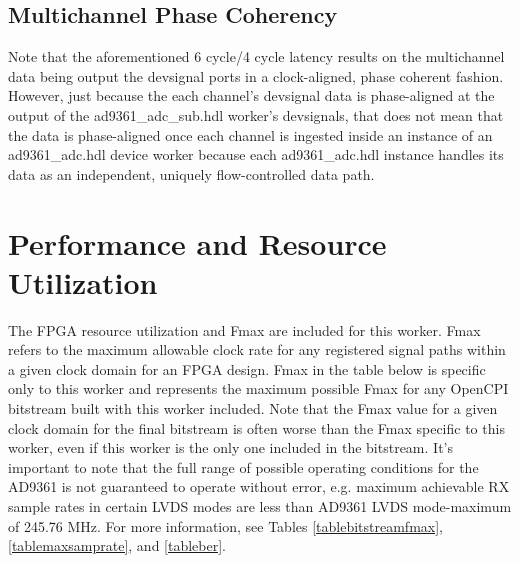 \documentclass{article}
\def\comp{ad9361\_adc\_sub}
\begin{document}
\subsection*{Multichannel Phase Coherency}
Note that the aforementioned 6 cycle/4 cycle latency results on the multichannel data being output the devsignal ports in a clock-aligned, phase coherent fashion. However, just because the each channel's devsignal data is phase-aligned at the output of the \comp{}.hdl worker's devsignals, that does not mean that the data is phase-aligned once each channel is ingested inside an instance of an ad9361\_adc.hdl device worker because each ad9361\_adc.hdl instance handles its data as an independent, uniquely flow-controlled data path.

\pagebreak
\section*{Performance and Resource Utilization}
\noindent
The FPGA resource utilization and Fmax are included for this worker. Fmax refers to the maximum allowable clock rate for any registered signal paths within a given clock domain for an FPGA design. Fmax in the table below is specific only to this worker and represents the maximum possible Fmax for any OpenCPI bitstream built with this worker included. Note that the Fmax value for a given clock domain for the final bitstream is often worse than the Fmax specific to this worker, even if this worker is the only one included in the bitstream. It's important to note that the full range of possible operating conditions for the AD9361 is not guaranteed to operate without error, e.g. maximum achievable RX sample rates in certain LVDS modes are less than AD9361 LVDS mode-maximum of 245.76 MHz\cite{adi_ug570}. For more information, see Tables \ref{tablebitstreamfmax}, \ref{tablemaxsamprate}, and \ref{tableber}. \\
\end{document}
